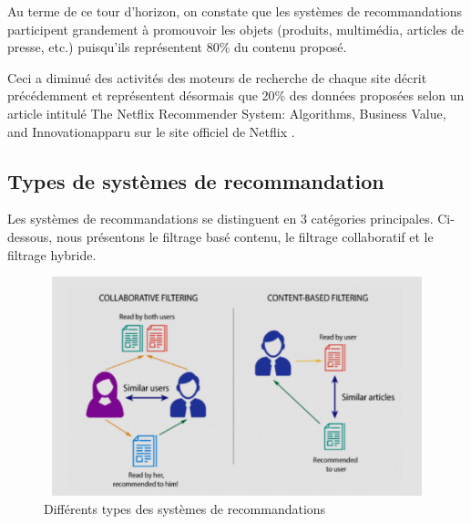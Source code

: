 Au terme de ce tour d'horizon, on constate que les systèmes de recommandations participent grandement à promouvoir les objets (produits, multimédia, articles de presse, etc.) puisqu'ils représentent 80\% du contenu proposé. 

Ceci a diminué des activités des moteurs de recherche de chaque site décrit précédemment et représentent désormais que 20\% des données proposées selon un article intitulé \textquotedbl The Netflix Recommender System: Algorithms, Business Value, and Innovation\textquotedbl apparu sur le site officiel de Netflix \cite{netflix}.

\subsection{Types de systèmes de recommandation}
Les systèmes de recommandations se distinguent en 3 catégories principales. Ci-dessous, nous présentons le filtrage basé contenu, le filtrage collaboratif et le filtrage hybride.

\begin{figure}[H]
    \centering
    \includegraphics[height=180pt,width=350pt]{img/chapter1/filtering.png}
    \caption{Différents types des systèmes de recommandations \cite{figfiltering}}
\end{figure}


